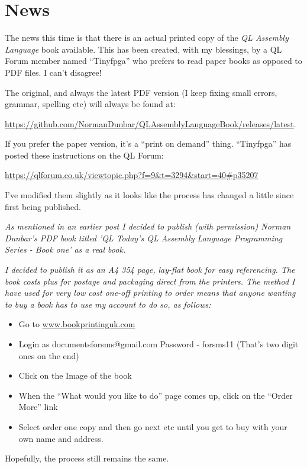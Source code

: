 
\chapter{News}

The news this time is that there is an actual printed copy of the
\emph{QL Assembly Language} book available. This has been created,
with my blessings, by a QL Forum member named ``Tinyfpga'' who prefers
to read paper books as opposed to PDF files. I can't disagree!

The original, and always the latest PDF version (I keep fixing small
errors, grammar, spelling etc) will always be found at:

\href{https://github.com/NormanDunbar/QLAssemblyLanguageBook/releases/latest}{https://github.com/NormanDunbar/QLAssemblyLanguageBook/releases/latest}.

If you prefer the paper version, it's a ``print on demand'' thing.
``Tinyfpga'' has posted these instructions on the QL Forum:

\href{https://qlforum.co.uk/viewtopic.php?f=9&t=3294&start=40\#p35207}{https://qlforum.co.uk/viewtopic.php?f=9\&{}t=3294\&{}start=40\#{}p35207}

I've modified them slightly as it looks like the process has changed
a little since first being published.

\emph{As mentioned in an earlier post I decided to \textquotedbl{}publish\textquotedbl{}
(with permission) Norman Dunbar's PDF book titled 'QL Today's QL Assembly
Language Programming Series - Book one' as a real book.}

\emph{I decided to publish it as an A4 354 page, lay-flat book for
easy referencing. The book costs  plus 
for postage and packaging direct from the printers. The method I have
used for very low cost one-off printing to order means that anyone
wanting to buy a book has to use my account to do so, as follows:}
\begin{itemize}
\item Go to \href{http://www.bookprintinguk.com}{www.bookprintinguk.com} 
\item Login as documentsforsms@gmail.com Password - forsms11 (That's two
digit ones on the end)
\item Click on the Image of the book
\item When the ``What would you like to do'' page comes up, click on the
``Order More'' link
\item Select \textquotedbl{}order one copy\textquotedbl{} and then go next
etc until you get to buy with your own name and address.
\end{itemize}
Hopefully, the process still remains the same.

